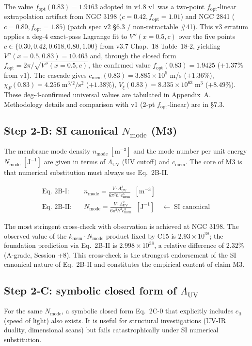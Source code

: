 \documentclass[11pt,a4paper]{article}
\newcommand{\kmem}{k_{\mathrm{mem}}}
\newcommand{\cmem}{c_{\mathrm{mem}}}
\newcommand{\Vxi}{V_{\xi}}
\newcommand{\Nmode}{N_{\mathrm{mode}}}
\newcommand{\nmode}{n_{\mathrm{mode}}}
\newcommand{\Lambdauv}{\Lambda_{\mathrm{UV}}}
\newcommand{\clt}{c_{\mathrm{lt}}}
\newcommand{\fopt}{f_{\mathrm{opt}}}
\begin{document}
The value $\fopt(0.83) = 1.9163$ adopted in v4.8 v1 was a two-point $\fopt$-linear extrapolation
artifact from NGC 3198 ($c=0.42, \fopt=1.01$) and NGC 2841 ($c=0.80, \fopt=1.85$)
(patch spec v2 \S 6.3 / non-retractable \#41). This v3 erratum applies a deg-4 exact-pass
Lagrange fit to $V''(x=0.5, c)$ over the five points
$c \in \{0.30, 0.42, 0.618, 0.80, 1.00\}$ from v3.7 Chap.~18 Table~18-2, yielding
$V''(x=0.5, 0.83) = 10.463$ and, through the closed form $\fopt = 2\pi/\sqrt{V''(x=0.5,c)}$,
the confirmed value $\fopt(0.83) = 1.9425$ ($+1.37\%$ from v1). The cascade gives
$\cmem(0.83) = 3.885 \times 10^{5}$ m/s ($+1.36\%$),
$\chi_F(0.83) = 4.256\;\mathrm{m}^{3/2}/\mathrm{s}^2$ ($+1.38\%$),
$\Vxi(0.83) = 8.335 \times 10^{63}\;\mathrm{m}^3$ ($+8.49\%$). These deg-4-confirmed
universal values are tabulated in Appendix~A. Methodology details and comparison with v1 (2-pt
$\fopt$-linear) are in \S 7.3.

\subsection{Step 2-B: SI canonical $\Nmode$ (M3)}
The membrane mode density $\nmode\;[\mathrm{m}^{-3}]$ and the mode number per unit energy
$\Nmode\;[\mathrm{J}^{-1}]$ are given in terms of $\Lambdauv$ (UV cutoff) and $\cmem$. The core of
M3 is that numerical substitution must always use Eq.~2B-II.

\begin{keybox}
\begin{align*}
\text{Eq.~2B-I:}\quad &\nmode = \frac{V \cdot \Lambdauv^3}{6\pi^2 \hbar^3 \cmem^3}\;\; [\mathrm{m}^{-3}] \\
\text{Eq.~2B-II:}\quad &\Nmode = \frac{V \cdot \Lambdauv^2}{6\pi^2 \hbar^3 \cmem^3}\;\; [\mathrm{J}^{-1}]
\quad \leftarrow\;\text{SI canonical}
\end{align*}
\end{keybox}

The most stringent cross-check with observation is achieved at NGC 3198. The observed value of the
$\kmem \cdot \Nmode$ product fixed by C15 is $2.93 \times 10^{38}$; the foundation prediction via
Eq.~2B-II is $2.998 \times 10^{38}$, a relative difference of 2.32\% (A-grade, Session +8). This
cross-check is the strongest endorsement of the SI canonical nature of Eq.~2B-II and constitutes
the empirical content of claim M3.

\subsection{Step 2-C: symbolic closed form of $\Lambdauv$}
For the same $\Nmode$, a symbolic closed form Eq.~2C-0 that explicitly includes $\clt$ (speed of
light) also exists. It is useful for structural investigations (UV-IR duality, dimensional scans)
but fails catastrophically under SI numerical substitution.
\end{document}
